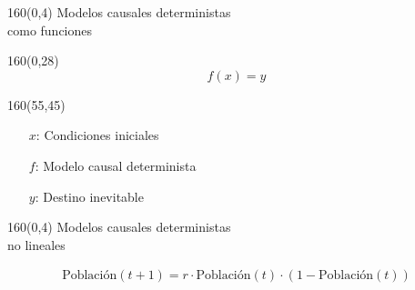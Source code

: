 \documentclass[shownotes,aspectratio=169]{beamer}
\begin{document}
\begin{frame}[plain]
 \begin{textblock}{160}(0,4)
 \centering \LARGE
 Modelos causales deterministas \\  \Large como funciones
\end{textblock}
\vspace{0.75cm}


\begin{textblock}{160}(0,28)
\begin{equation*}
 f(x) = y
\end{equation*}
\end{textblock}

\begin{textblock}{160}(55,45)
\centering
\begin{itemize}
 \item[$x$:] 
    {Condiciones iniciales} 
 \item[$f$:] 
    {Modelo causal determinista}
 \item[$y$:] 
    {Destino inevitable}
\end{itemize}
\end{textblock}



\end{frame}



\begin{frame}[plain]
 \begin{textblock}{160}(0,4)
 \centering \LARGE
 Modelos causales deterministas \\  \Large no lineales
\end{textblock}
\vspace{0.75cm}

\begin{align*}
 \text{Población}(t+1) = r \cdot \text{Población}(t)\cdot (1-\text{Población}(t))
\end{align*}

\vspace{0.5cm}

\pause

\centering

 


\end{frame}
\end{document}
